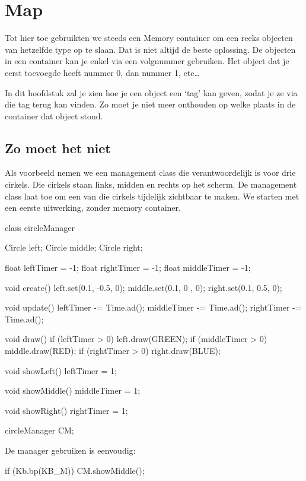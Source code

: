 \chapter{Map}
Tot hier toe gebruikten we steeds een Memory container om een reeks objecten van hetzelfde type op te slaan. Dat is niet altijd de beste oplossing. De objecten in een container kan je enkel via een volgnummer gebruiken. Het object dat je eerst toevoegde heeft nummer 0, dan nummer 1, etc\ldots 

In dit hoofdstuk zal je zien hoe je een object een `tag' kan geven, zodat je ze via die tag terug kan vinden. Zo moet je niet meer onthouden op welke plaats in de container dat object stond.

\section{Zo moet het niet}

Als voorbeeld nemen we een management class die verantwoordelijk is voor drie cirkels. Die cirkels staan links, midden en rechts op het scherm. De management class laat toe om een van die cirkels tijdelijk zichtbaar te maken. We starten met een eerste uitwerking, zonder memory container.

\begin{code}
class circleManager {
  Circle left;
  Circle middle;
  Circle right;
  
  float leftTimer = -1;
  float rightTimer = -1;
  float middleTimer = -1;
  
  void create() {
    left.set(0.1, -0.5, 0);
    middle.set(0.1, 0 , 0);
    right.set(0.1, 0.5, 0);
  }
  
  void update() {
    leftTimer -= Time.ad();
    middleTimer -= Time.ad();
    rightTimer -= Time.ad();
  }
  
  void draw() {
    if (leftTimer > 0) left.draw(GREEN);
    if (middleTimer > 0) middle.draw(RED);
    if (rightTimer > 0) right.draw(BLUE);
  }
  
  void showLeft() {
    leftTimer = 1;
  }
  
  void showMiddle() {
    middleTimer = 1;
  }
  
  void showRight() {
    rightTimer = 1;
  }
}
circleManager CM;
\end{code}

De manager gebruiken is eenvoudig:

\begin{code}
if (Kb.bp(KB_M)) CM.showMiddle();
\end{code}


